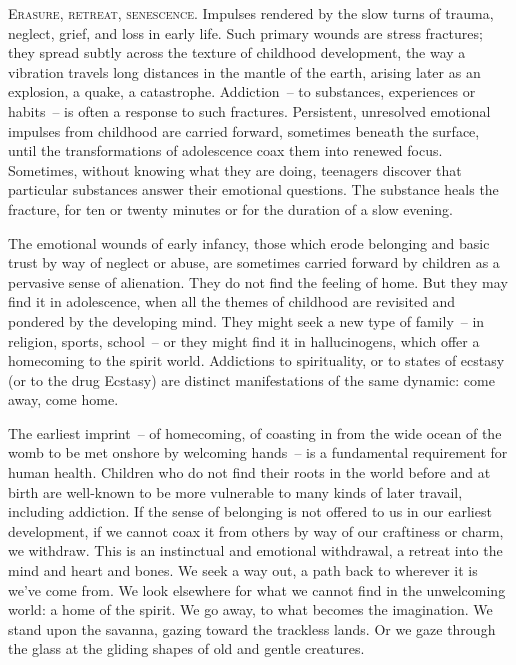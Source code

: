 \documentclass[10pt,DIV09,letterpaper,oneside,headsepline]{scrreprt}
\begin{document}
\vspace{\baselineskip}
\lettrine[nindent=2pt]{\textcolor[gray]{0.1}{E}}{rasure, retreat, senescence. }
Impulses rendered by the slow turns of trauma, neglect, grief, and loss in early life. Such primary wounds are stress fractures; they spread subtly across the texture of childhood development, the way a vibration travels long distances in the mantle of the earth, arising later as an explosion, a quake, a catastrophe. Addiction~-- to substances, experiences or habits~-- is often a response to such fractures. Persistent, unresolved emotional impulses from childhood are carried forward, sometimes beneath the surface, until the transformations of adolescence coax them into renewed focus. Sometimes, without knowing what they are doing, teenagers discover that particular substances answer their emotional questions. The substance heals the fracture, for ten or twenty minutes or for the duration of a slow evening.

The emotional wounds of early infancy, those which erode belonging and basic trust by way of neglect or abuse, are sometimes carried forward by children as a pervasive sense of alienation. They do not find the feeling of home. But they may find it in adolescence, when all the themes of childhood are revisited and pondered by the developing mind. They might seek a new type of family~-- in religion, sports, school~-- or they might find it in hallucinogens, which offer a homecoming to the spirit world. Addictions to spirituality, or to states of ecstasy (or to the drug Ecstasy) are distinct manifestations of the same dynamic: come away, come home.

The earliest imprint~-- of homecoming, of coasting in from the wide ocean of the womb to be met onshore by welcoming hands~-- is a fundamental requirement for human health. Children who do not find their roots in the world before and at birth are well-known to be more vulnerable to many kinds of later travail, including addiction. If the sense of belonging is not offered to us in our earliest development, if we cannot coax it from others by way of our craftiness or charm, we withdraw. This is an instinctual and emotional withdrawal, a retreat into the mind and heart and bones. We seek a way out, a path back to wherever it is we've come from. We look elsewhere for what we cannot find in the unwelcoming world: a home of the spirit. We go away, to what becomes the imagination. We stand upon the savanna, gazing toward the trackless lands. Or we gaze through the glass at the gliding shapes of old and gentle creatures.
\end{document}
